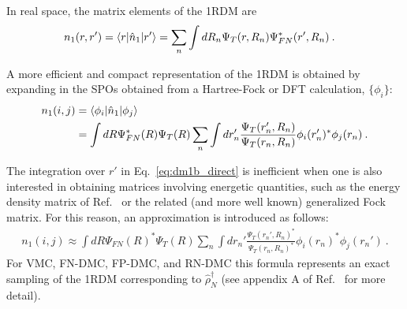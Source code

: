 In real space, the matrix elements of the 1RDM are
\begin{align}
  n_1(r,r') &= \langle r \rvert\hat{n}_1\lvert r' \rangle = \sum_n\int dR_n \Psi_T(r,R_n)\Psi_{FN}^*(r',R_n)\:. 
\end{align}

A more efficient and compact representation of the 1RDM is obtained by expanding in the SPOs obtained from a Hartree-Fock or DFT calculation, $\{\phi_i\}$:
\begin{align}\label{eq:dm1b_direct}
  n_1(i,j) &= \langle \phi_i \rvert\hat{n}_1\lvert \phi_j \rangle \nonumber \\
           &= \int dR \Psi_{FN}^*(R)\Psi_{T}(R) \sum_n\int dr'_n \frac{\Psi_T(r_n',R_n)}{\Psi_T(r_n,R_n)}\phi_i(r_n')^* \phi_j(r_n)\:.
\end{align} 

The integration over $r'$ in Eq.~\ref{eq:dm1b_direct} is inefficient when one is also interested in obtaining matrices involving energetic quantities, such as the energy density matrix of Ref.~\cite{Krogel2014} or the related (and more well known) generalized Fock matrix.  For this reason, an approximation is introduced as follows:
\begin{align}
    n_1(i,j) \approx \int dR \Psi_{FN}(R)^*\Psi_T(R)  \sum_n \int dr_n' \frac{\Psi_T(r_n',R_n)^*}{\Psi_T(r_n,R_n)^*}\phi_i(r_n)^* \phi_j(r_n')\:. 
\end{align}
For VMC, FN-DMC, FP-DMC, and RN-DMC this formula represents an exact sampling of the 1RDM corresponding to $\hat{\rho}_N^\dagger$ (see appendix A of Ref.~\cite{Krogel2014} for more detail).




